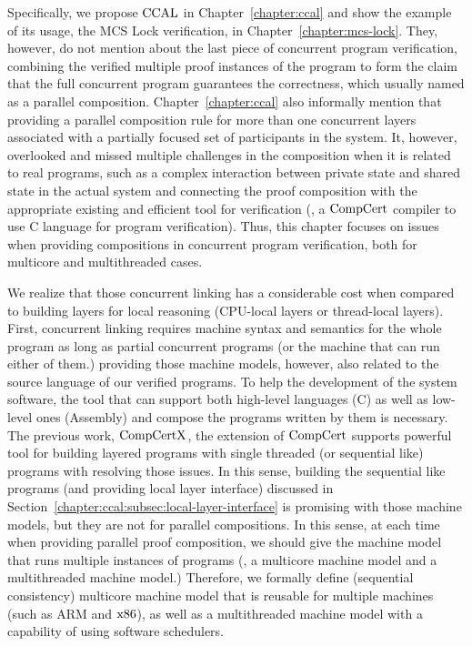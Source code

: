    

Specifically, we propose  $\mathrm{CCAL}$ in Chapter~\ref{chapter:ccal} and show the example of its usage, the MCS Lock verification, in Chapter~\ref{chapter:mcs-lock}.
They, however, do not mention about the last piece of concurrent program verification, 
combining the verified multiple proof instances of the program
to form the claim that the full concurrent program guarantees the correctness,
which usually named as a parallel composition. 
Chapter~\ref{chapter:ccal} also informally mention that providing a  parallel composition rule for more than one
concurrent layers associated with a partially focused set of participants in the system. 
It, however, overlooked and missed multiple challenges in the composition when it is related to real programs,
such as a complex interaction between private state and shared state in the actual system
and connecting the proof composition with the appropriate existing and efficient tool for verification (\ie, a $\mathrm{CompCert}$ compiler to use C language for program verification).
Thus, this chapter focuses on  issues when providing compositions in concurrent program verification,
both for multicore and multithreaded cases.

We realize that those concurrent linking has a considerable cost when compared to building layers for local reasoning (CPU-local layers or thread-local layers).
First, concurrent linking requires machine syntax and semantics 
for the whole program as long as partial concurrent programs (or the machine that can run either of them.)
providing those machine models, however, also related to the source language of our verified programs.
To help the development of the system software, 
the tool that can support both high-level languages (C) as well as low-level ones (Assembly) and 
compose the programs written by them is necessary.
The previous work, $\mathrm{CompCertX}$, the extension of $\mathrm{CompCert}$
supports powerful tool for building layered programs with single threaded (or sequential like) programs with 
resolving those issues.
In this sense, 
building the sequential like programs (and providing local layer interface) discussed in Section~\ref{chapter:ccal:subsec:local-layer-interface} 
is promising with those machine models,
but they are not for parallel compositions. 
In this sense, at each time when providing parallel proof composition, 
we should give the machine model that runs multiple instances of programs (\ie, a multicore machine model and a multithreaded machine model.) 
Therefore, we formally define (sequential consistency) multicore machine model that is reusable for multiple machines (such as ARM and $\mathrm{x86}$),  
as well as a multithreaded machine model with a capability of using software schedulers. 



